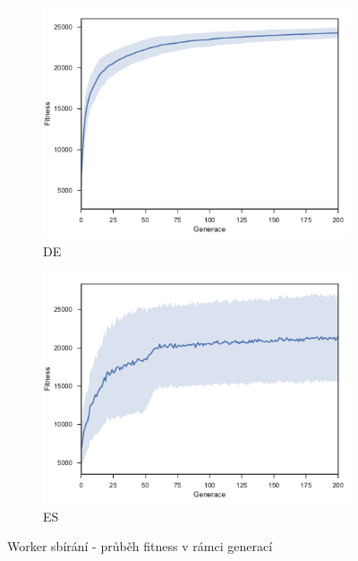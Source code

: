 	\begin{figure}[p]
		\centering
		\begin{subfigure}{.5\textwidth}
			\centering
			\includegraphics[width=\linewidth]{../img/WoodMap/DE/WorkerPickUpMem}
			\caption{DE}
			\label{obr04:PickupDE}
		\end{subfigure}%
		\begin{subfigure}{.5\textwidth}
			\centering
			\includegraphics[width=\linewidth]{../img/WoodMap/ES/WoodPickupES}
			\caption{ES}
			\label{obr04:PickupES}
		\end{subfigure}
		\caption{Worker sbírání - průběh fitness v rámci generací}
		\label{obr04:Pickup}
	\end{figure}
	\clearpage
